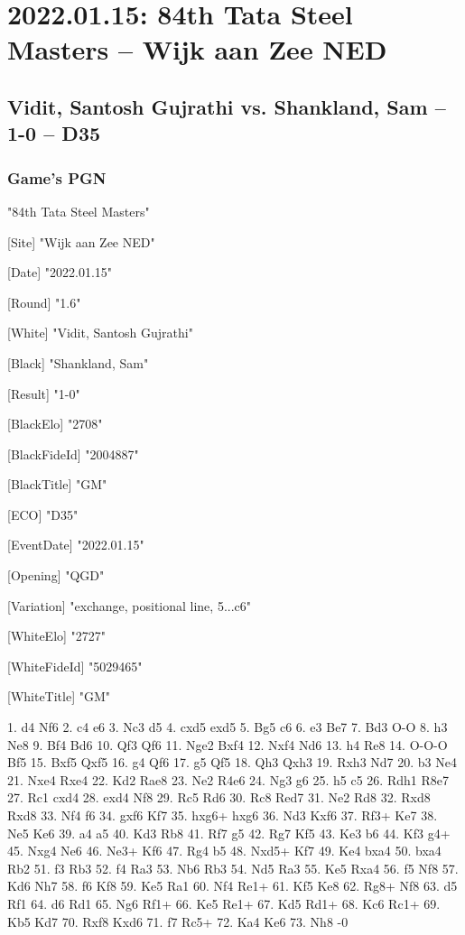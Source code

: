 \documentclass[9pt]{extarticle}
\begin{document}
\section*{2022.01.15: 84th Tata Steel Masters -- Wijk aan Zee NED}

\subsection*{Vidit, Santosh Gujrathi vs. Shankland, Sam -- 1-0 -- D35}
\subsubsection*{Game's PGN}
\begin{flushleft}
[Event] "84th Tata Steel Masters"

[Site] "Wijk aan Zee NED"

[Date] "2022.01.15"

[Round] "1.6"

[White] "Vidit, Santosh Gujrathi"

[Black] "Shankland, Sam"

[Result] "1-0"

[BlackElo] "2708"

[BlackFideId] "2004887"

[BlackTitle] "GM"

[ECO] "D35"

[EventDate] "2022.01.15"

[Opening] "QGD"

[Variation] "exchange, positional line, 5...c6"

[WhiteElo] "2727"

[WhiteFideId] "5029465"

[WhiteTitle] "GM"

\end{flushleft}
\begin{flushleft}
1. d4 Nf6 2. c4 e6 3. Nc3 d5 4. cxd5 exd5 5. Bg5 c6 6. e3 Be7 7. Bd3 O-O 8. h3 Ne8 9. Bf4 Bd6 10. Qf3 Qf6 11. Nge2 Bxf4 12. Nxf4 Nd6 13. h4 Re8 14. O-O-O Bf5 15. Bxf5 Qxf5 16. g4 Qf6 17. g5 Qf5 18. Qh3 Qxh3 19. Rxh3 Nd7 20. b3 Ne4 21. Nxe4 Rxe4 22. Kd2 Rae8 23. Ne2 R4e6 24. Ng3 g6 25. h5 c5 26. Rdh1 R8e7 27. Rc1 cxd4 28. exd4 Nf8 29. Rc5 Rd6 30. Rc8 Red7 31. Ne2 Rd8 32. Rxd8 Rxd8 33. Nf4 f6 34. gxf6 Kf7 35. hxg6+ hxg6 36. Nd3 Kxf6 37. Rf3+ Ke7 38. Ne5 Ke6 39. a4 a5 40. Kd3 Rb8 41. Rf7 g5 42. Rg7 Kf5 43. Ke3 b6 44. Kf3 g4+ 45. Nxg4 Ne6 46. Ne3+ Kf6 47. Rg4 b5 48. Nxd5+ Kf7 49. Ke4 bxa4 50. bxa4 Rb2 51. f3 Rb3 52. f4 Ra3 53. Nb6 Rb3 54. Nd5 Ra3 55. Ke5 Rxa4 56. f5 Nf8 57. Kd6 Nh7 58. f6 Kf8 59. Ke5 Ra1 60. Nf4 Re1+ 61. Kf5 Ke8 62. Rg8+ Nf8 63. d5 Rf1 64. d6 Rd1 65. Ng6 Rf1+ 66. Ke5 Re1+ 67. Kd5 Rd1+ 68. Kc6 Rc1+ 69. Kb5 Kd7 70. Rxf8 Kxd6 71. f7 Rc5+ 72. Ka4 Ke6 73. Nh8 \quad  {}-0
\end{flushleft}
\end{document}
